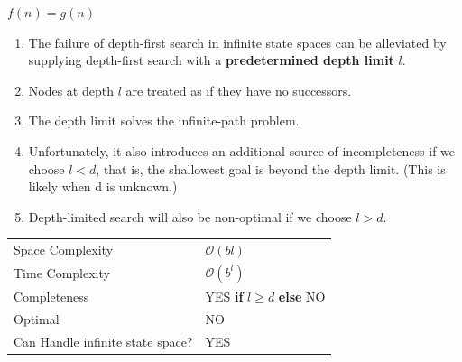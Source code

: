 \begin{center}
    $f(n) = g(n)$
\end{center}

\begin{enumerate}
    \item The failure of depth-first search in infinite state spaces can be alleviated by supplying depth-first search with a \textbf{predetermined depth limit} $l$.
    
    \item Nodes at depth $l$ are treated as if they have no successors. 
    
    \item The depth limit solves the infinite-path problem. 
    
    \item Unfortunately, it also introduces an additional source of incompleteness if we choose $l < d$, that is, the shallowest goal is beyond the depth limit. (This is likely when d is unknown.) 
    
    \item Depth-limited search will also be non-optimal if we choose $l > d$.
\end{enumerate}


\begin{customTableWrapper}{1.2}
\begin{longtable}{p{3cm} p{6cm}}
    Space Complexity & $\mathcal{O}(bl)$ \\

    Time Complexity & $\mathcal{O}(b^l)$ \\

    \hline

    Completeness & YES \textbf{if} \textit{$l \geq d$} \textbf{else} NO \\

    Optimal & NO \\

    Can Handle infinite state space? & YES \\
\end{longtable}
\end{customTableWrapper}


